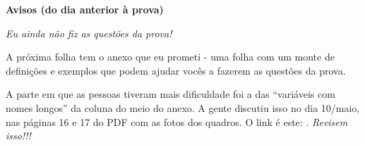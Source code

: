 \documentclass[oneside,12pt]{article}
\begin{document}
% 
% 


\newpage

{\bf Avisos (do dia anterior à prova)}

{\sl Eu ainda não fiz as questões da prova!}

A próxima folha tem o anexo que eu prometi - uma folha com um monte de
definições e exemplos que podem ajudar vocês a fazerem as questões da
prova.

A parte em que as pessoas tiveram mais dificuldade foi a das
``variáveis com nomes longos'' da coluna do meio do anexo. A gente
discutiu isso no dia 10/maio, nas páginas 16 e 17 do PDF com as fotos
dos quadros. O link é este: . {\sl Revisem isso!!!} \quad
\smile







\end{document}
